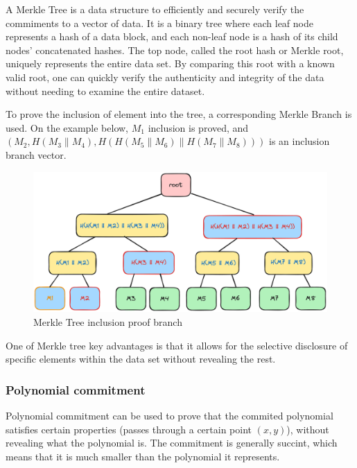\documentclass[../lecture-notes.tex]{subfiles}
\begin{document}
A Merkle Tree is a data structure to efficiently and securely verify the commiments to a vector of data. It is a binary tree where each leaf node represents a hash of a data block, and each non-leaf node is a hash of its child nodes' concatenated hashes. The top node, called the root hash or Merkle root, uniquely represents the entire data set. By comparing this root with a known valid root, one can quickly verify the authenticity and integrity of the data without needing to examine the entire dataset. 

To prove the inclusion of element into the tree, a corresponding Merkle Branch is used. On the example below, $M_1$ inclusion is proved, and 
$(M_2, H(M_3 \parallel M_4), H(H(M_5 \parallel M_6) \parallel H(M_7 \parallel M_8)))$ is an inclusion branch vector.

\begin{figure}[H]
    \centering\includegraphics[width=0.9\linewidth, clip]{images/lecture_5/MerkleTreeProof.png}

    \caption{Merkle Tree inclusion proof branch}
\end{figure}

One of Merkle tree key advantages is that it allows for the selective disclosure of specific elements within the data set without revealing the rest. 

\subsubsection{Polynomial commitment}

Polynomial commitment can be used to prove that the commited polynomial satisfies certain properties (passes through a certain point $(x,y)$), without revealing what the polynomial is.
The commitment is generally succint, which means that it is much smaller than the polynomial it represents.

\vspace{0.5 cm}
\end{document}
